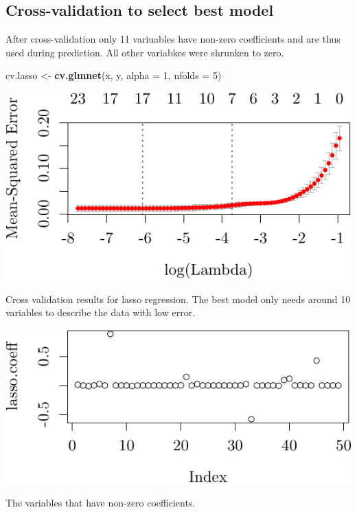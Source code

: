 \documentclass[]{tufte-handout}
\newenvironment{Shaded}{}{}
\newcommand{\KeywordTok}[1]{\textcolor[rgb]{0.00,0.44,0.13}{\textbf{{#1}}}}
\newcommand{\DataTypeTok}[1]{\textcolor[rgb]{0.56,0.13,0.00}{{#1}}}
\newcommand{\DecValTok}[1]{\textcolor[rgb]{0.25,0.63,0.44}{{#1}}}
\newcommand{\StringTok}[1]{\textcolor[rgb]{0.25,0.44,0.63}{{#1}}}
\newcommand{\NormalTok}[1]{{#1}}
\begin{document}
\subsection{Cross-validation to select best
model}\label{cross-validation-to-select-best-model}

After cross-validation only 11 variuables have non-zero coefficients and
are thus used during prediction. All other variabkes were shrunken to
zero.

\begin{Shaded}
\begin{Highlighting}[]
\NormalTok{cv.lasso <-}\StringTok{ }\KeywordTok{cv.glmnet}\NormalTok{(x, y, }\DataTypeTok{alpha =} \DecValTok{1}\NormalTok{, }\DataTypeTok{nfolds =} \DecValTok{5}\NormalTok{)}
\end{Highlighting}
\end{Shaded}

\begin{marginfigure}
 \includegraphics{tufte_files/figure-latex/lasso2-1.pdf}
\caption{Cross validation results for lasso regression. The best model only needs around 10 variables to describe the data with low error.}
\end{marginfigure}\begin{marginfigure}
 \includegraphics{tufte_files/figure-latex/lasso2-2.pdf}
\caption{The variables that have non-zero coefficients.}
\end{marginfigure}
\end{document}
